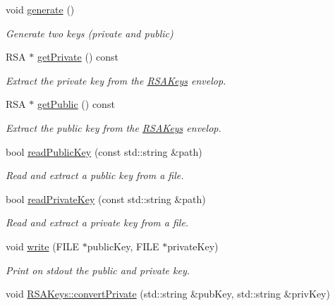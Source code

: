 \begin{DoxyCompactItemize}
void \hyperlink{class_spider_1_1ssl_1_1_r_s_a_keys_acd779c58e9168d10fef5468015af063e}{generate} ()
\begin{DoxyCompactList}\small\item\em Generate two keys (private and public) \end{DoxyCompactList}\item 
R\+SA $\ast$ \hyperlink{class_spider_1_1ssl_1_1_r_s_a_keys_afec6c4762821ae4179adebbef1e4ee66}{get\+Private} () const
\begin{DoxyCompactList}\small\item\em Extract the private key from the \hyperlink{class_spider_1_1ssl_1_1_r_s_a_keys}{R\+S\+A\+Keys} envelop. \end{DoxyCompactList}\item 
R\+SA $\ast$ \hyperlink{class_spider_1_1ssl_1_1_r_s_a_keys_afa3b28ea88c61b6ddf602e70843d6471}{get\+Public} () const
\begin{DoxyCompactList}\small\item\em Extract the public key from the \hyperlink{class_spider_1_1ssl_1_1_r_s_a_keys}{R\+S\+A\+Keys} envelop. \end{DoxyCompactList}\item 
bool \hyperlink{class_spider_1_1ssl_1_1_r_s_a_keys_ae9702fe70c7ec6ef761995dd0fbb6abf}{read\+Public\+Key} (const std\+::string \&path)
\begin{DoxyCompactList}\small\item\em Read and extract a public key from a file. \end{DoxyCompactList}\item 
bool \hyperlink{class_spider_1_1ssl_1_1_r_s_a_keys_a9d177902b9051cd1b064b6597f3a3697}{read\+Private\+Key} (const std\+::string \&path)
\begin{DoxyCompactList}\small\item\em Read and extract a private key from a file. \end{DoxyCompactList}\item 
void \hyperlink{class_spider_1_1ssl_1_1_r_s_a_keys_a765563842f5a69b424d72cab3a77b678}{write} (F\+I\+LE $\ast$public\+Key, F\+I\+LE $\ast$private\+Key)
\begin{DoxyCompactList}\small\item\em Print on stdout the public and private key. \end{DoxyCompactList}\item 
void \hyperlink{class_spider_1_1ssl_1_1_r_s_a_keys_aabe857dba27e4cc8bd1d2a09b65082b8}{R\+S\+A\+Keys\+::convert\+Private} (std\+::string \&pub\+Key, std\+::string \&priv\+Key)

\end{DoxyCompactItemize}
